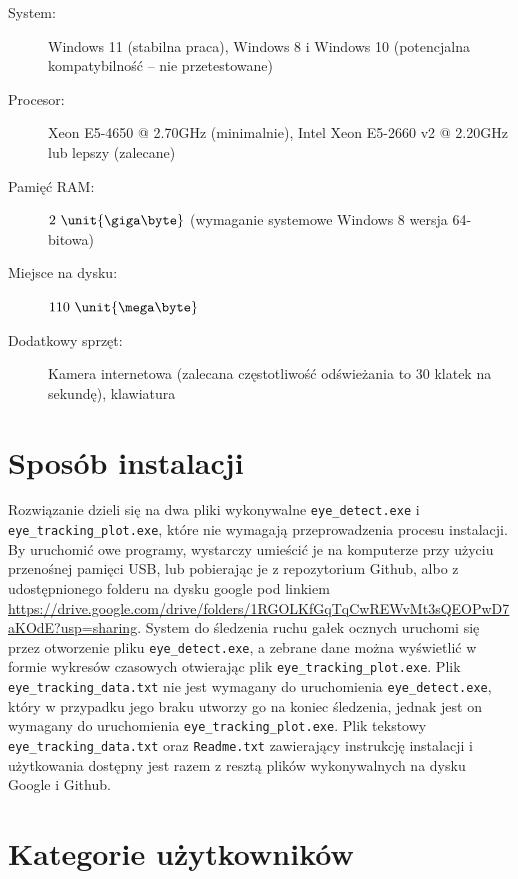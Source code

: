 \documentclass[a4paper,twoside,12pt]{book}
\begin{document}
\begin{description}
	\item[System:] Windows 11 (stabilna praca), Windows 8 i Windows 10 (potencjalna kompatybilność -- nie przetestowane)
	\item[Procesor:] Xeon E5-4650 @ 2.70GHz (minimalnie), Intel Xeon E5-2660 v2 @ 2.20GHz lub lepszy (zalecane)
	\item[Pamięć RAM:] $2 \ \unit{\giga\byte}$ (wymaganie systemowe Windows 8 wersja 64-bitowa)
	\item[Miejsce na dysku:] $110 \ \unit{\mega\byte}$
	\item[Dodatkowy sprzęt:] Kamera internetowa (zalecana częstotliwość odświeżania to $30$ klatek na sekundę), klawiatura
\end{description}

\section{Sposób instalacji}
\label{sec:Sposob-instalacji}

Rozwiązanie dzieli się na dwa pliki wykonywalne \texttt{eye\_\-detect.exe} \allowbreak i \texttt{eye\_\-tracking\_\-plot.exe}, które nie wymagają przeprowadzenia procesu instalacji. By uruchomić owe programy, wystarczy umieścić je na komputerze przy użyciu przenośnej pamięci USB, lub pobierając je z repozytorium Github, albo z udostępnionego folderu na dysku google pod linkiem \url{https://drive.google.com/drive/folders/1RGOLKfGqTqCwREWvMt3sQEOPwD7aKOdE?usp=sharing}. System do śledzenia ruchu gałek ocznych uruchomi się przez otworzenie pliku \texttt{eye\_detect.exe}, a zebrane dane można wyświetlić w formie wykresów czasowych otwierając plik \texttt{eye\_tracking\_plot.exe}. Plik \texttt{eye\_tracking\_data.txt} nie jest wymagany do uruchomienia \texttt{eye\_detect.exe}, który w przypadku jego braku utworzy go na koniec śledzenia, jednak jest on wymagany do uruchomienia \texttt{eye\_tracking\_plot.exe}. Plik tekstowy \texttt{eye\_tracking\_data.txt} oraz \texttt{Readme.txt} zawierający instrukcję instalacji i użytkowania dostępny jest razem z resztą plików wykonywalnych na dysku Google i Github.

\section{Kategorie użytkowników}
\label{sec:Kategorie-uzytkownikow}
\end{document}
